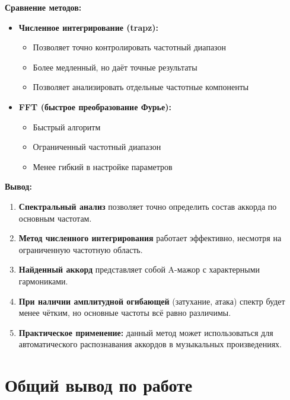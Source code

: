 \textbf{Сравнение методов:}

\begin{itemize}
    \item \textbf{Численное интегрирование (trapz):}
    \begin{itemize}
        \item Позволяет точно контролировать частотный диапазон
        \item Более медленный, но даёт точные результаты
        \item Позволяет анализировать отдельные частотные компоненты
    \end{itemize}
    
    \item \textbf{FFT (быстрое преобразование Фурье):}
    \begin{itemize}
        \item Быстрый алгоритм
        \item Ограниченный частотный диапазон
        \item Менее гибкий в настройке параметров
    \end{itemize}
\end{itemize}

\textbf{Вывод:}

\begin{enumerate}
    \item \textbf{Спектральный анализ} позволяет точно определить состав аккорда по основным частотам.
    
    \item \textbf{Метод численного интегрирования} работает эффективно, несмотря на ограниченную частотную область.
    
    \item \textbf{Найденный аккорд} представляет собой A-мажор с характерными гармониками.
    
    \item \textbf{При наличии амплитудной огибающей} (затухание, атака) спектр будет менее чётким, но основные частоты всё равно различимы.
    
    \item \textbf{Практическое применение:} данный метод может использоваться для автоматического распознавания аккордов в музыкальных произведениях.
\end{enumerate}

\section*{Общий вывод по работе}

